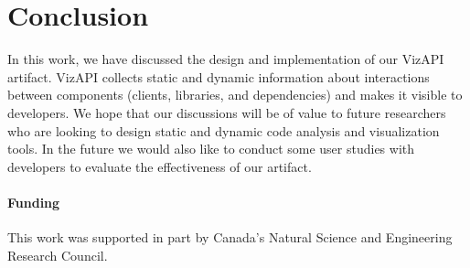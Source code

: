 \section{Conclusion}
In this work, we have discussed the design and implementation of our
VizAPI artifact. VizAPI collects static and dynamic information
about interactions between components (clients, libraries, and dependencies) and makes
it visible to developers. We hope that our discussions will be of value
to future researchers who are looking to design static and dynamic
code analysis and visualization tools. In the future we would also like
to conduct some user studies with developers to evaluate the effectiveness of our artifact. 

\paragraph{Funding} This work was supported in part by Canada's Natural Science and Engineering Research Council.

